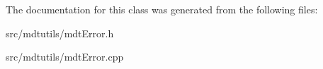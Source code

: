 The documentation for this class was generated from the following files:\begin{DoxyCompactItemize}
\item 
src/mdtutils/mdtError.h\item 
src/mdtutils/mdtError.cpp\end{DoxyCompactItemize}
